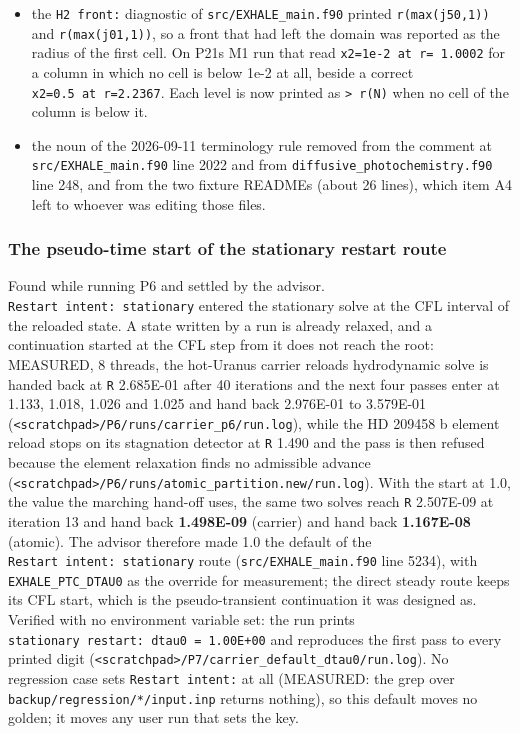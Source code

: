 \documentclass[english,a4paper]{my_memo}
\providecommand{\tightlist}{\setlength{\itemsep}{0pt}\setlength{\parskip}{0pt}}
\begin{document}
\begin{itemize}
\tightlist
\item
  the \texttt{H2\ front:} diagnostic of \texttt{src/EXHALE\_main.f90} printed
  \texttt{r(max(j50,1))} and \texttt{r(max(j01,1))}, so a front that had left the domain was
  reported as the radius of the first cell. On P21\textquotesingle s M1 run that read
  \texttt{x2=1e-2\ at\ r=\ 1.0002} for a column in which no cell is below 1e-2 at all,
  beside a correct \texttt{x2=0.5\ at\ r=2.2367}. Each level is now printed as \texttt{\textgreater{}\ r(N)}
  when no cell of the column is below it.
\item
  the noun of the 2026-09-11 terminology rule removed from the comment at
  \texttt{src/EXHALE\_main.f90} line 2022 and from
  \texttt{diffusive\_photochemistry.f90} line 248, and from the two fixture READMEs
  (about 26 lines), which item A4 left to whoever was editing those files.
\end{itemize}

\subsubsection{The pseudo-time start of the stationary restart route}\label{the-pseudo-time-start-of-the-stationary-restart-route}

Found while running P6 and settled by the advisor. \texttt{Restart\ intent:\ stationary} entered the stationary solve at the CFL interval of the reloaded
state. A state written by a run is already relaxed, and a continuation
started at the CFL step from it does not reach the root: MEASURED, 8 threads,
the hot-Uranus carrier reload\textquotesingle s hydrodynamic solve is handed back at \texttt{\textbar{}\textbar{}R\textbar{}\textbar{}}
2.685E-01 after 40 iterations and the next four passes enter at 1.133, 1.018,
1.026 and 1.025 and hand back 2.976E-01 to 3.579E-01
(\texttt{\textless{}scratchpad\textgreater{}/P6/runs/carrier\_p6/run.log}), while the HD 209458 b element
reload stops on its stagnation detector at \texttt{\textbar{}\textbar{}R\textbar{}\textbar{}} 1.490 and the pass is then
refused because the element relaxation finds no admissible advance
(\texttt{\textless{}scratchpad\textgreater{}/P6/runs/atomic\_partition.new/run.log}). With the start at 1.0,
the value the marching hand-off uses, the same two solves reach \texttt{\textbar{}\textbar{}R\textbar{}\textbar{}}
2.507E-09 at iteration 13 and hand back \textbf{1.498E-09} (carrier) and hand back
\textbf{1.167E-08} (atomic). The advisor therefore made 1.0 the default of the
\texttt{Restart\ intent:\ stationary} route (\texttt{src/EXHALE\_main.f90} line 5234), with
\texttt{EXHALE\_PTC\_DTAU0} as the override for measurement; the direct steady route
keeps its CFL start, which is the pseudo-transient continuation it was
designed as. Verified with no environment variable set: the run prints
\texttt{stationary\ restart:\ dtau0\ =\ 1.00E+00} and reproduces the first pass to every
printed digit (\texttt{\textless{}scratchpad\textgreater{}/P7/carrier\_default\_dtau0/run.log}). No
regression case sets \texttt{Restart\ intent:} at all (MEASURED: the grep over
\texttt{backup/regression/*/input.inp} returns nothing), so this default moves no
golden; it moves any user run that sets the key.
\end{document}
